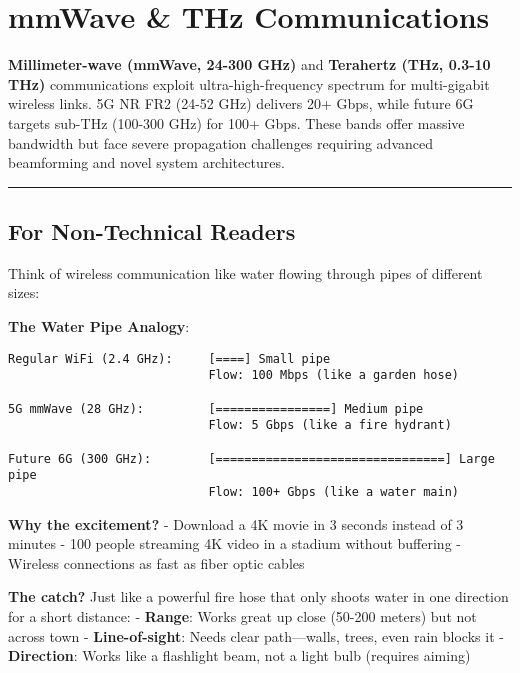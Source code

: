 \section{mmWave \& THz Communications}\label{mmwave-thz-communications}

\textbf{Millimeter-wave (mmWave, 24-300 GHz)} and \textbf{Terahertz
(THz, 0.3-10 THz)} communications exploit ultra-high-frequency spectrum
for multi-gigabit wireless links. 5G NR FR2 (24-52 GHz) delivers 20+
Gbps, while future 6G targets sub-THz (100-300 GHz) for 100+ Gbps. These
bands offer massive bandwidth but face severe propagation challenges
requiring advanced beamforming and novel system architectures.

\begin{center}\rule{0.5\linewidth}{0.5pt}\end{center}

\subsection{\texorpdfstring{ For Non-Technical
Readers}{ For Non-Technical Readers}}\label{for-non-technical-readers}

Think of wireless communication like water flowing through pipes of
different sizes:

\textbf{The Water Pipe Analogy}:

\begin{verbatim}
Regular WiFi (2.4 GHz):     [====] Small pipe
                            Flow: 100 Mbps (like a garden hose)

5G mmWave (28 GHz):         [================] Medium pipe
                            Flow: 5 Gbps (like a fire hydrant)

Future 6G (300 GHz):        [================================] Large pipe
                            Flow: 100+ Gbps (like a water main)
\end{verbatim}

\textbf{Why the excitement?} - Download a 4K movie in 3 seconds instead
of 3 minutes - 100 people streaming 4K video in a stadium without
buffering - Wireless connections as fast as fiber optic cables

\textbf{The catch?} Just like a powerful fire hose that only shoots
water in one direction for a short distance: - \textbf{Range}: Works
great up close (50-200 meters) but not across town -
\textbf{Line-of-sight}: Needs clear path---walls, trees, even rain
blocks it - \textbf{Direction}: Works like a flashlight beam, not a
light bulb (requires aiming)

